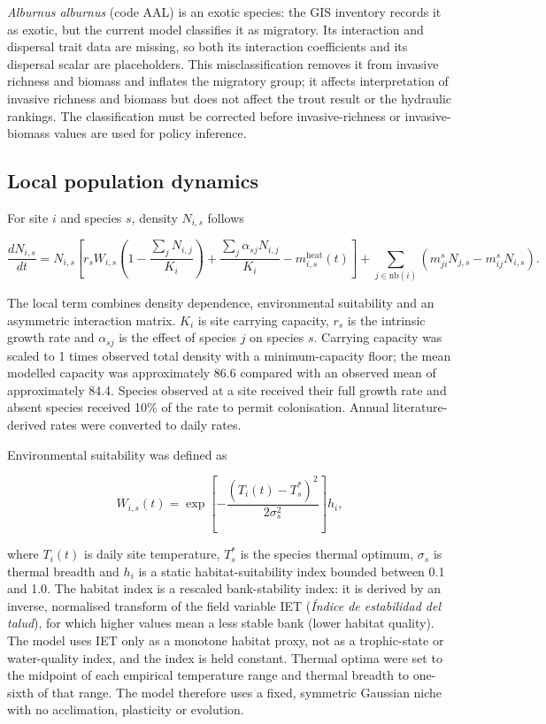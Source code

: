 \documentclass[11pt,a4paper]{article}
\begin{document}
\textit{Alburnus alburnus} (code AAL) is an exotic species: the GIS inventory records it as exotic, but the current model classifies it as migratory. Its interaction and dispersal trait data are missing, so both its interaction coefficients and its dispersal scalar are placeholders. This misclassification removes it from invasive richness and biomass and inflates the migratory group; it affects interpretation of invasive richness and biomass but does not affect the trout result or the hydraulic rankings. The classification must be corrected before invasive-richness or invasive-biomass values are used for policy inference.

\subsection{Local population dynamics}

For site $i$ and species $s$, density $N_{i,s}$ follows

\begin{equation}
\frac{dN_{i,s}}{dt} = N_{i,s}\left[r_s W_{i,s}\left(1-\frac{\sum_j N_{i,j}}{K_i}\right) + \frac{\sum_j \alpha_{sj}N_{i,j}}{K_i} - m^{\mathrm{heat}}_{i,s}(t)\right]
 + \sum_{j\in\mathrm{nb}(i)}\left(m^s_{ji}N_{j,s}-m^s_{ij}N_{i,s}\right).
\end{equation}

The local term combines density dependence, environmental suitability and an asymmetric interaction matrix. $K_i$ is site carrying capacity, $r_s$ is the intrinsic growth rate and $\alpha_{sj}$ is the effect of species $j$ on species $s$. Carrying capacity was scaled to 1 times observed total density with a minimum-capacity floor; the mean modelled capacity was approximately 86.6 compared with an observed mean of approximately 84.4. Species observed at a site received their full growth rate and absent species received 10\% of the rate to permit colonisation. Annual literature-derived rates were converted to daily rates.

Environmental suitability was defined as

\begin{equation}
W_{i,s}(t) = \exp\left[-\frac{(T_i(t)-T_s^*)^2}{2\sigma_s^2}\right]h_i,
\end{equation}

where $T_i(t)$ is daily site temperature, $T_s^*$ is the species thermal optimum, $\sigma_s$ is thermal breadth and $h_i$ is a static habitat-suitability index bounded between 0.1 and 1.0. The habitat index is a rescaled bank-stability index: it is derived by an inverse, normalised transform of the field variable IET (\textit{\'Indice de estabilidad del talud}), for which higher values mean a less stable bank (lower habitat quality). The model uses IET only as a monotone habitat proxy, not as a trophic-state or water-quality index, and the index is held constant. Thermal optima were set to the midpoint of each empirical temperature range and thermal breadth to one-sixth of that range. The model therefore uses a fixed, symmetric Gaussian niche with no acclimation, plasticity or evolution.
\end{document}
